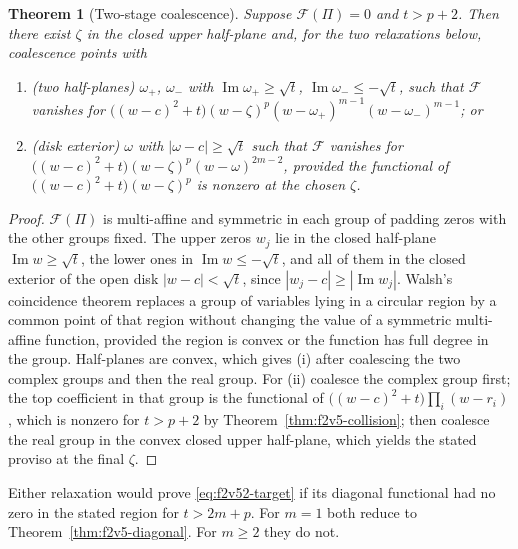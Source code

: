 \documentclass[11pt]{article}
\newtheorem{theorem}{Theorem}[section]
\theoremstyle{definition}
\theoremstyle{remark}
\begin{document}
\begin{theorem}[Two-stage coalescence]
\label{thm:f2v52-walsh}
Suppose \(\mathcal F(\Pi)=0\) and \(t>p+2\).  Then there exist
\(\zeta\) in the closed upper half-plane and, for the two relaxations
below, coalescence points with
\begin{enumerate}[label=\textup{(\roman*)}]
\item (two half-planes) \(\omega_+\), \(\omega_-\) with
\(\operatorname{Im}\omega_+\ge\sqrt t\), \(\operatorname{Im}\omega_-\le-\sqrt t\),
such that \(\mathcal F\) vanishes for
\(\bigl((w-c)^2+t\bigr)(w-\zeta)^p(w-\omega_+)^{m-1}(w-\omega_-)^{m-1}\); or
\item (disk exterior) \(\omega\) with \(|\omega-c|\ge\sqrt t\) such that
\(\mathcal F\) vanishes for
\(\bigl((w-c)^2+t\bigr)(w-\zeta)^p(w-\omega)^{2m-2}\), provided the
functional of \(\bigl((w-c)^2+t\bigr)(w-\zeta)^p\) is nonzero at the
chosen \(\zeta\).
\end{enumerate}
\end{theorem}

\begin{proof}
\(\mathcal F(\Pi)\) is multi-affine and symmetric in each group of
padding zeros with the other groups fixed.  The upper zeros \(w_j\) lie
in the closed half-plane \(\operatorname{Im}w\ge\sqrt t\), the lower ones
in \(\operatorname{Im}w\le-\sqrt t\), and all of them in the closed
exterior of the open disk \(|w-c|<\sqrt t\), since
\(|w_j-c|\ge|\operatorname{Im}w_j|\).  Walsh's coincidence theorem
replaces a group of variables lying in a circular region by a common
point of that region without changing the value of a symmetric
multi-affine function, provided the region is convex or the function
has full degree in the group.  Half-planes are convex, which gives (i)
after coalescing the two complex groups and then the real group.  For
(ii) coalesce the complex group first; the top coefficient in that group
is the functional of \(\bigl((w-c)^2+t\bigr)\prod_i(w-r_i)\), which is
nonzero for \(t>p+2\) by Theorem~\ref{thm:f2v5-collision}; then coalesce
the real group in the convex closed upper half-plane, which yields the
stated proviso at the final \(\zeta\).
\end{proof}

Either relaxation would prove \eqref{eq:f2v52-target} if its diagonal
functional had no zero in the stated region for \(t>2m+p\).  For
\(m=1\) both reduce to Theorem~\ref{thm:f2v5-diagonal}.  For \(m\ge2\)
they do not.
\end{document}
